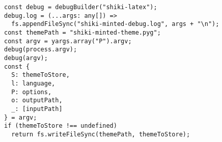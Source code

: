\documentclass{article}
\begin{document}
\begin{verbatim}
const debug = debugBuilder("shiki-latex");
debug.log = (...args: any[]) =>
  fs.appendFileSync("shiki-minted-debug.log", args + "\n");
const themePath = "shiki-minted-theme.pyg";
const argv = yargs.array("P").argv;
debug(process.argv);
debug(argv);
const {
  S: themeToStore,
  l: language,
  P: options,
  o: outputPath,
  _: [inputPath]
} = argv;
if (themeToStore !== undefined)
  return fs.writeFileSync(themePath, themeToStore);
\end{verbatim}
\end{document}

